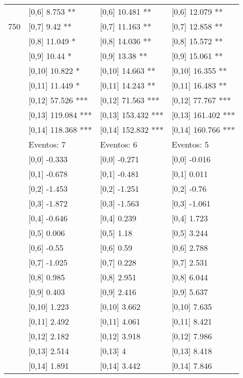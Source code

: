 \begin{table}
\begin{tabular}[t]{llll}
 & {}[0,6] 8.753 ** & {}[0,6] 10.481 ** & {}[0,6] 12.079 **\\
750 & {}[0,7] 9.42 ** & {}[0,7] 11.163 ** & {}[0,7] 12.858 **\\
\addlinespace
 & {}[0,8] 11.049 * & {}[0,8] 14.036 ** & {}[0,8] 15.572 **\\
 & {}[0,9] 10.44 * & {}[0,9] 13.38 ** & {}[0,9] 15.061 **\\
 & {}[0,10] 10.822 * & {}[0,10] 14.663 ** & {}[0,10] 16.355 **\\
 & {}[0,11] 11.449 * & {}[0,11] 14.243 ** & {}[0,11] 16.483 **\\
 & {}[0,12] 57.526 *** & {}[0,12] 71.563 *** & {}[0,12] 77.767 ***\\
\addlinespace
 & {}[0,13] 119.084 *** & {}[0,13] 153.432 *** & {}[0,13] 161.402 ***\\
 & {}[0,14] 118.368 *** & {}[0,14] 152.832 *** & {}[0,14] 160.766 ***\\
 & Eventos:  7 & Eventos:  6 & Eventos:  5\\
 & {}[0,0] -0.333 & {}[0,0] -0.271 & {}[0,0] -0.016\\
 & {}[0,1] -0.678 & {}[0,1] -0.481 & {}[0,1] 0.011\\
\addlinespace
 & {}[0,2] -1.453 & {}[0,2] -1.251 & {}[0,2] -0.76\\
 & {}[0,3] -1.872 & {}[0,3] -1.563 & {}[0,3] -1.061\\
 & {}[0,4] -0.646 & {}[0,4] 0.239 & {}[0,4] 1.723\\
 & {}[0,5] 0.006 & {}[0,5] 1.18 & {}[0,5] 3.244\\
 & {}[0,6] -0.55 & {}[0,6] 0.59 & {}[0,6] 2.788\\
\addlinespace
1000 & {}[0,7] -1.025 & {}[0,7] 0.228 & {}[0,7] 2.531\\
 & {}[0,8] 0.985 & {}[0,8] 2.951 & {}[0,8] 6.044\\
 & {}[0,9] 0.403 & {}[0,9] 2.416 & {}[0,9] 5.637\\
 & {}[0,10] 1.223 & {}[0,10] 3.662 & {}[0,10] 7.635\\
 & {}[0,11] 2.492 & {}[0,11] 4.061 & {}[0,11] 8.421\\
\addlinespace
 & {}[0,12] 2.182 & {}[0,12] 3.918 & {}[0,12] 7.986\\
 & {}[0,13] 2.514 & {}[0,13] 4 & {}[0,13] 8.418\\
 & {}[0,14] 1.891 & {}[0,14] 3.442 & {}[0,14] 7.846\\
\bottomrule
\end{tabular}
\end{table}
